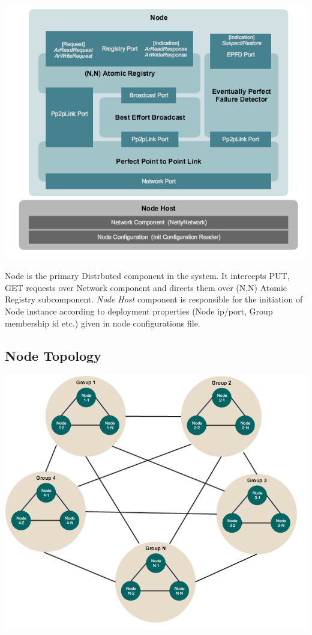 \documentclass[a4paper, 11pt]{article}
\begin{document}
{\centering\includegraphics[scale = 0.5]{./images/design_overview.png}\par}

Node is the primary Distrbuted component in the system. It intercepts PUT, GET requests over Network component and directs them over (N,N) Atomic Registry subcomponent. \textit{Node Host} component is responsible for the initiation of Node instance according to deployment properties (Node ip/port, Group membership id etc.) given in node configurations file.

\subsection{Node Topology}

{\centering\includegraphics[scale = 0.6]{./images/node_setup.png}\par}
\end{document}
